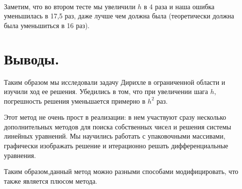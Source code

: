 \documentclass[12pt,a4paper]{scrartcl}
\begin{document}
\\
Заметим, что во втором тесте мы увеличили $h$ в 4 раза и наша ошибка уменьшилась в 17,5 раз, даже лучше чем должна была (теоретически должна была уменьшиться в 16 раз).

\newpage
\section{Выводы.}

Таким образом мы исследовали задачу Дирихле в ограниченной области и изучили ход ее решения. Убедились в том, что при увеличении шага $h$, погрешность решения уменьшается примерно в $h^2$ раз.

Этот метод не очень прост в реализации: в нем участвуют сразу несколько дополнительных методов для поиска собственных чисел и решения системы линейных уравнений. Мы научились работать с упаковочными массивами, графически изображать решение и итерационно решать дифференциальные уравнения.

Таким образом,данный метод можно разными способами модифицировать, что также является плюсом метода.
\end{document}
